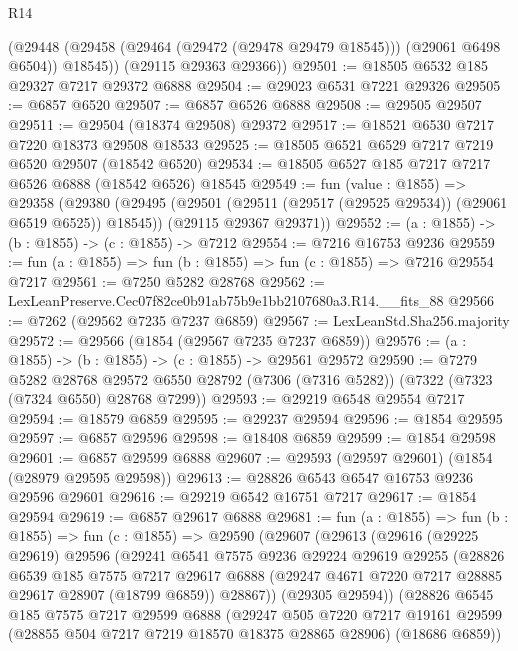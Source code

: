 \begin{lexlean}{R14}
\begin{coremodule}
        (@29448 (@29458 (@29464 (@29472 (@29478 @29479 @18545))) (@29061 @6498 @6504)) @18545))
      (@29115 @29363 @29366))
@29501 := @18505 @6532 @185 @29327 @7217 @29372 @6888
@29504 := @29023 @6531 @7221 @29326
@29505 := @6857 @6520
@29507 := @6857 @6526 @6888
@29508 := @29505 @29507
@29511 := @29504 (@18374 @29508) @29372
@29517 := @18521 @6530 @7217 @7220 @18373 @29508 @18533
@29525 := @18505 @6521 @6529 @7217 @7219 @6520 @29507 (@18542 @6520)
@29534 := @18505 @6527 @185 @7217 @7217 @6526 @6888 (@18542 @6526) @18545
@29549 := fun (value : @1855) =>
  @29358
    (@29380
      (@29495 (@29501 (@29511 (@29517 (@29525 @29534)) (@29061 @6519 @6525)) @18545))
      (@29115 @29367 @29371))
@29552 := (a : @1855) -> (b : @1855) -> (c : @1855) -> @7212
@29554 := @7216 @16753 @9236
@29559 := fun (a : @1855) => fun (b : @1855) => fun (c : @1855) => @7216 @29554 @7217
@29561 := @7250 @5282 @28768
@29562 := LexLeanPreserve.Cec07f82ce0b91ab75b9e1bb2107680a3.R14.__fits_88
@29566 := @7262 (@29562 @7235 @7237 @6859)
@29567 := LexLeanStd.Sha256.majority
@29572 := @29566 (@1854 (@29567 @7235 @7237 @6859))
@29576 := (a : @1855) -> (b : @1855) -> (c : @1855) -> @29561 @29572
@29590 := @7279
    @5282
    @28768
    @29572
    @6550
    @28792
    (@7306 (@7316 @5282))
    (@7322 (@7323 (@7324 @6550) @28768 @7299))
@29593 := @29219 @6548 @29554 @7217
@29594 := @18579 @6859
@29595 := @29237 @29594
@29596 := @1854 @29595
@29597 := @6857 @29596
@29598 := @18408 @6859
@29599 := @1854 @29598
@29601 := @6857 @29599 @6888
@29607 := @29593 (@29597 @29601) (@1854 (@28979 @29595 @29598))
@29613 := @28826 @6543 @6547 @16753 @9236 @29596 @29601
@29616 := @29219 @6542 @16751 @7217
@29617 := @1854 @29594
@29619 := @6857 @29617 @6888
@29681 := fun (a : @1855) =>
  fun (b : @1855) =>
  fun (c : @1855) =>
  @29590
    (@29607
      (@29613
        (@29616
          (@29225 @29619)
          @29596
          (@29241
            @6541
            @7575
            @9236
            @29224
            @29619
            @29255
            (@28826
              @6539
              @185
              @7575
              @7217
              @29617
              @6888
              (@29247 @4671 @7220 @7217 @28885 @29617 @28907 (@18799 @6859))
              @28867))
          (@29305 @29594))
        (@28826
          @6545
          @185
          @7575
          @7217
          @29599
          @6888
          (@29247
            @505
            @7220
            @7217
            @19161
            @29599
            (@28855 @504 @7217 @7219 @18570 @18375 @28865 @28906)
            (@18686 @6859))

\end{coremodule}
\end{lexlean}
